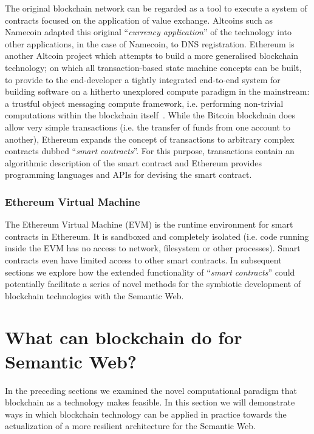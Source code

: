 The original blockchain network can be regarded as a tool to execute a system of contracts focused on the application of value exchange. Altcoins such as Namecoin adapted this original ``\textit{currency application}'' of the technology into other applications, in the case of Namecoin, to DNS registration. 
Ethereum is another Altcoin project which attempts to build a more generalised blockchain technology; on which all transaction-based state machine concepts can be built, to provide to the end-developer a tightly integrated end-to-end system for building software on a hitherto unexplored compute paradigm in the mainstream: a trustful object messaging compute framework, i.e. performing non-trivial computations within the blockchain itself~\cite{wood2014ethereum}.
While the Bitcoin blockchain does allow very simple transactions (i.e. the transfer of funds from one account to another), Ethereum expands the concept of transactions to arbitrary complex contracts dubbed ``\textit{smart contracts}''. For this purpose, transactions contain an algorithmic description of the smart contract and Ethereum provides programming languages and APIs for devising the smart contract. 

\subsubsection{Ethereum Virtual Machine}

The Ethereum Virtual Machine (EVM) is the runtime environment for smart contracts in Ethereum.  It is sandboxed and completely isolated (i.e. code running inside the EVM has no access to network, filesystem or other processes). Smart contracts even have limited access to other smart contracts. 
In subsequent sections we explore how the extended functionality of ``\textit{smart contracts}'' could potentially facilitate a series of novel methods for the symbiotic development of blockchain technologies with the Semantic Web. 


\section{What can blockchain do for Semantic Web?}

In the preceding sections we examined the novel computational paradigm that blockchain as a technology makes feasible. In this section we will demonstrate ways in which blockchain technology can be applied in practice towards the actualization of a more resilient architecture for the Semantic Web. 

